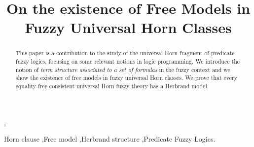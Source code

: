 \documentclass{IOS-Book-Article}
\begin{document}
\begin{frontmatter}

\title{On the existence of Free Models in Fuzzy Universal Horn Classes}






\author[A,B]{ },
\author[A,B,C]{ }

\address[A]{Universitat Aut\`onoma de Barcelona\\
}

\vspace{-0.4cm}

\address[B]{Artificial Intelligence Research Institute (IIIA - CSIC)\\
Campus UAB, 08193 Bellaterra, Catalonia (Spain) \\
}

\vspace{-0.4cm}

\address[C]{Barcelona Graduate School of Mathematics\\
\\
\\}



\begin{abstract}
This paper is a contribution to the study of the universal Horn fragment of predicate fuzzy logics, focusing on some relevant notions in logic programming. We introduce the notion of \emph{term structure associated to a set of formulas} in the fuzzy context and we show the existence of free models in fuzzy universal Horn classes.  We prove that every equality-free consistent universal Horn fuzzy theory has a Herbrand model. 
\end{abstract}


\begin{keyword}  Horn clause \sep Free model  \sep Herbrand structure \sep  Predicate Fuzzy Logics.



\end{keyword}

\end{frontmatter}


\maketitle
\end{document}
